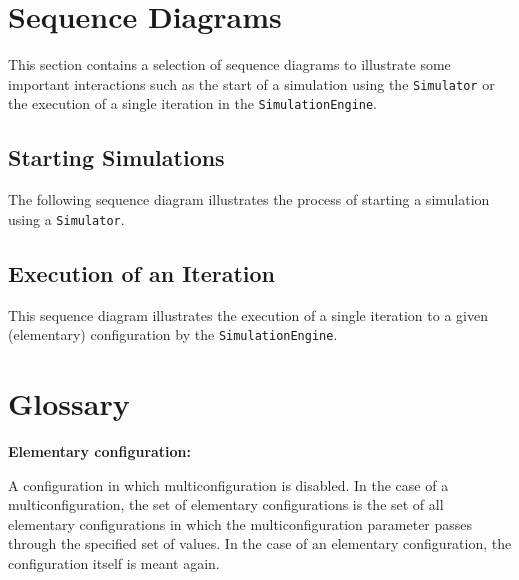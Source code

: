 \documentclass[parskip=full,11pt]{scrartcl}
\begin{document}
\section{Sequence Diagrams}
This section contains a selection of sequence diagrams to illustrate some important interactions such as the start of a simulation using the \texttt{Simulator} or the execution of a single iteration in the \texttt{SimulationEngine}.

\subsection{Starting Simulations}
The following sequence diagram illustrates the process of starting a simulation using a \texttt{Simulator}.

\subsection{Execution of an Iteration}
This sequence diagram illustrates the execution of a single iteration to a given (elementary) configuration by the \texttt{SimulationEngine}.

\section{Glossary}
\textbf{Elementary configuration:}

A configuration in which multiconfiguration is disabled. In the case of a multiconfiguration, the set of elementary configurations is the set of all elementary configurations in which the multiconfiguration parameter passes through the specified set of values. In the case of an elementary configuration, the configuration itself is meant again.
\end{document}
